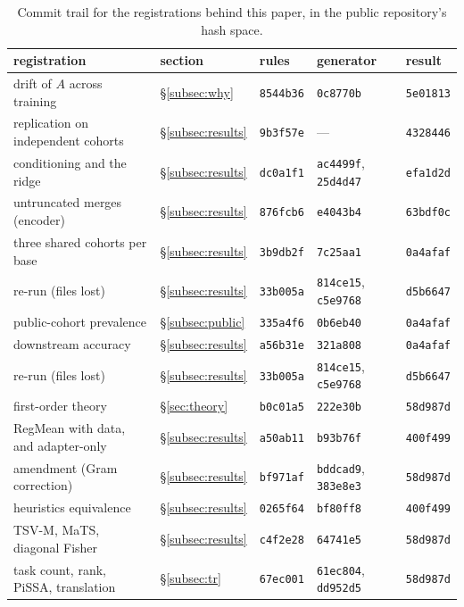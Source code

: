\begin{table}[pos=h]
\centering
\small
\caption{Commit trail for the registrations behind this paper, in the public
repository's hash space.}
\label{tab:commits}
\begin{tabular}{p{5.2cm}llp{2.2cm}l}
\toprule
registration & section & rules & generator & result \\
\midrule
drift of $A$ across training & \S\ref{subsec:why} & \texttt{8544b36} & \texttt{0c8770b} & \texttt{5e01813} \\
replication on independent cohorts & \S\ref{subsec:results} & \texttt{9b3f57e} & --- & \texttt{4328446} \\
conditioning and the ridge & \S\ref{subsec:results} & \texttt{dc0a1f1} & \texttt{ac4499f}, \texttt{25d4d47} & \texttt{efa1d2d} \\
untruncated merges (encoder) & \S\ref{subsec:results} & \texttt{876fcb6} & \texttt{e4043b4} & \texttt{63bdf0c} \\
three shared cohorts per base & \S\ref{subsec:results} & \texttt{3b9db2f} & \texttt{7c25aa1} & \texttt{0a4afaf} \\
\quad re-run (files lost) & \S\ref{subsec:results} & \texttt{33b005a} & \texttt{814ce15}, \texttt{c5e9768} & \texttt{d5b6647} \\
public-cohort prevalence & \S\ref{subsec:public} & \texttt{335a4f6} & \texttt{0b6eb40} & \texttt{0a4afaf} \\
downstream accuracy & \S\ref{subsec:results} & \texttt{a56b31e} & \texttt{321a808} & \texttt{0a4afaf} \\
\quad re-run (files lost) & \S\ref{subsec:results} & \texttt{33b005a} & \texttt{814ce15}, \texttt{c5e9768} & \texttt{d5b6647} \\
\addlinespace
first-order theory & \S\ref{sec:theory} & \texttt{b0c01a5} & \texttt{222e30b} & \texttt{58d987d} \\
RegMean with data, and adapter-only & \S\ref{subsec:results} & \texttt{a50ab11} & \texttt{b93b76f} & \texttt{400f499} \\
\quad amendment (Gram correction) & \S\ref{subsec:results} & \texttt{bf971af} & \texttt{bddcad9}, \texttt{383e8e3} & \texttt{58d987d} \\
heuristics equivalence & \S\ref{subsec:results} & \texttt{0265f64} & \texttt{bf80ff8} & \texttt{400f499} \\
TSV-M, MaTS, diagonal Fisher & \S\ref{subsec:results} & \texttt{c4f2e28} & \texttt{64741e5} & \texttt{58d987d} \\
task count, rank, PiSSA, translation & \S\ref{subsec:tr} & \texttt{67ec001} & \texttt{61ec804}, \texttt{dd952d5} & \texttt{58d987d} \\

\end{tabular}
\end{table}
